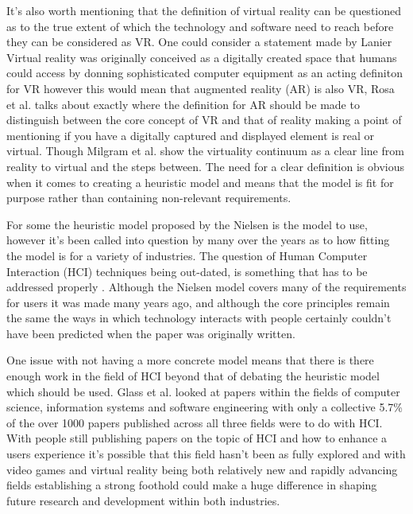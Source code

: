 \documentclass{scrartcl}
\begin{document}
It's also worth mentioning that the definition of virtual reality can be questioned as to the true extent of which the technology and software need to reach before they can be considered as VR. One could consider a statement made by Lanier \cite{lanier1992virtual} Virtual reality was originally conceived as a digitally created space that humans could access by donning sophisticated computer equipment as an acting definiton for VR however this would mean that augmented reality (AR) is also VR,  Rosa et al. talks about exactly where the definition for AR should be made to distinguish between the core concept of VR and that of reality making a point of mentioning if you have a digitally captured and displayed element is real or virtual. \cite{rosa2016re} Though  Milgram et al. \cite{milgram1994taxonomy} show the virtuality continuum as a clear line from reality to virtual and the steps between. The need for a clear definition is obvious when it comes to creating a heuristic model and means that the model is fit for purpose rather than containing non-relevant requirements. 

For some the heuristic model proposed by the Nielsen \cite{nielsen1990heuristic} is the model to use, however it's been called into question by many over the years as to how fitting the model is for a variety of industries. \cite{pinelle2008heuristic, pinelle2009usability, sutcliffe2004heuristic, john1998traditional} The question of Human Computer Interaction (HCI) techniques being out-dated, is something that has to be addressed properly \cite{hvannberg2012exploitation}. Although the Nielsen model covers many of the requirements for users it was made many years ago, and although the core principles remain the same the ways in which technology interacts with people certainly couldn't have been predicted when the paper was originally written. 

One issue with not having a more concrete model means that there is there enough work in the field of HCI beyond that of debating the heuristic model which should be used. Glass et al. \cite{glass2004analysis} looked at papers within the fields of computer science, information systems and software engineering with only a collective 5.7\% of the over 1000 papers published across all three fields were to do with HCI. With people still publishing papers on the topic of HCI and how to enhance a users experience it's possible that this field hasn't been as fully explored and with video games and virtual reality being both relatively new and rapidly advancing fields establishing a strong foothold could make a huge difference in shaping future research and development within both industries.
\end{document}

